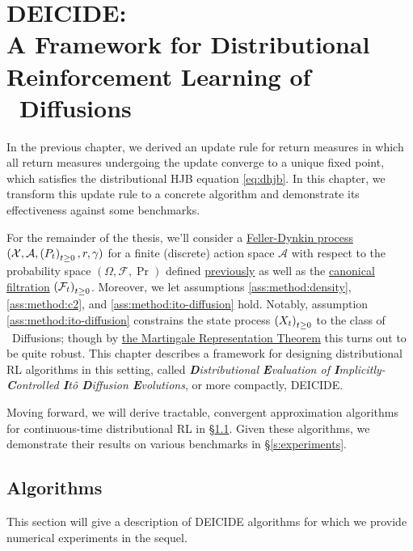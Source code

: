 \chapter[DEICIDE]{DEICIDE:\\\LARGE A Framework for Distributional
  Reinforcement Learning of \Ito\ Diffusions}\label{c:deicide}

In the previous chapter, we derived an update rule for return measures
in which all return measures undergoing the update converge to a
unique fixed point, which satisfies the distributional HJB
equation \eqref{eq:dhjb}. In this chapter, we transform
this update rule to a concrete algorithm and demonstrate its
effectiveness against some benchmarks.

For the remainder of the thesis, we'll consider a
\hyperref[def:fd]{Feller-Dynkin process} $(\mathcal{X}, \mathcal{A},
\indexedabove{t}{P}, r, \gamma)$ for a finite (discrete) action space
$\mathcal{A}$ with respect to the probability space
$(\Omega, \mathcal{F}, \Pr)$ defined
\hyperref[def:probability-space]{previously} as well as the
\hyperref[def:canonical-filtration]{canonical filtration}
$\indexedabove{t}{\mathcal{F}}$. Moreover, we let assumptions
\ref{ass:method:density}, \ref{ass:method:c2}, and
\ref{ass:method:ito-diffusion} hold. Notably, assumption
\ref{ass:method:ito-diffusion} constrains the state process
$\indexedabove{t}{X}$ to the class of \Ito\ Diffusions; though by
\hyperref[thm:martingale-representation]{the Martingale Representation
  Theorem} this turns out to be quite robust. This chapter describes a
framework for designing distributional RL algorithms in this setting,
called \emph{\textbf{D}istributional \textbf{E}valuation of
\textbf{I}mplicitly-\textbf{C}ontrolled \textbf{I}tô \textbf{D}iffusion
\textbf{E}volutions}, or more compactly, DEICIDE.

Moving forward, we will derive tractable, convergent approximation algorithms
for continuous-time distributional RL in \S\ref{s:deicide:alg}. Given these
algorithms, we demonstrate their results on various benchmarks in
\S\ref{s:experiments}.


\section{Algorithms}\label{s:deicide:alg}
This section will give a description of DEICIDE algorithms for which
we provide numerical experiments in the sequel.

